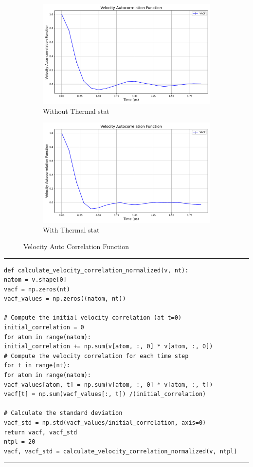 \documentclass[a4paper]{article}
\begin{document}
\begin{figure}[!h]
	\centering
	\captionsetup{justification=centering}
	\hfill
	\begin{subfigure}{0.4\linewidth}
		\includegraphics[width=\textwidth]{Images/vacfnopm.pdf}
		\caption{Without Thermal stat}
		\label{nopmvf}
	\end{subfigure}
	\hfill
	\begin{subfigure}{0.4\linewidth}
		\includegraphics[width=\textwidth]{Images/vacfpmtr=2.pdf}
		\caption{With Thermal stat}
		\label{pmvf}
	\end{subfigure}
	\caption{Velocity Auto Correlation Function}
	\label{fig:vf}
\end{figure}
\rule{\textwidth}{1pt}
\begin{lstlisting}
def calculate_velocity_correlation_normalized(v, nt):
natom = v.shape[0]
vacf = np.zeros(nt)
vacf_values = np.zeros((natom, nt))

# Compute the initial velocity correlation (at t=0)
initial_correlation = 0
for atom in range(natom):
initial_correlation += np.sum(v[atom, :, 0] * v[atom, :, 0])
# Compute the velocity correlation for each time step
for t in range(nt):
for atom in range(natom):
vacf_values[atom, t] = np.sum(v[atom, :, 0] * v[atom, :, t])
vacf[t] = np.sum(vacf_values[:, t]) /(initial_correlation)

# Calculate the standard deviation
vacf_std = np.std(vacf_values/initial_correlation, axis=0)
return vacf, vacf_std
ntpl = 20
vacf, vacf_std = calculate_velocity_correlation_normalized(v, ntpl)
\end{lstlisting}
\rule{\textwidth}{1pt}
\end{document}
